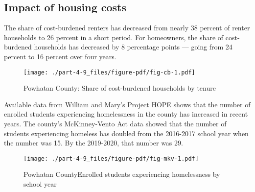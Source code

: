 \documentclass[
  letterpaper,
  DIV=11,
  numbers=noendperiod]{scrreprt}
\begin{document}
\hypertarget{impact-of-housing-costs-7}{%
\subsection{Impact of housing costs}\label{impact-of-housing-costs-7}}

The share of cost-burdened renters has decreased from nearly 38 percent
of renter households to 26 percent in a short period. For homeowners,
the share of cost-burdened households has decreased by 8 percentage
points --- going from 24 percent to 16 percent over four years.

\begin{figure}

{\centering \texttt{[image: ./part-4-9\_files/figure-pdf/fig-cb-1.pdf]}

}

\caption{\label{fig-cb}Powhatan County: Share of cost-burdened
households by tenure}

\end{figure}

Available data from William and Mary's Project HOPE shows that the
number of enrolled students experiencing homelessness in the county has
increased in recent years. The county's McKinney-Vento Act data showed
that the number of students experiencing homeless has doubled from the
2016-2017 school year when the number was 15. By the 2019-2020, that
number was 29.

\begin{figure}

{\centering \texttt{[image: ./part-4-9\_files/figure-pdf/fig-mkv-1.pdf]}

}

\caption{\label{fig-mkv}Powhatan CountyEnrolled students experiencing
homelessness by school year}

\end{figure}
\end{document}
